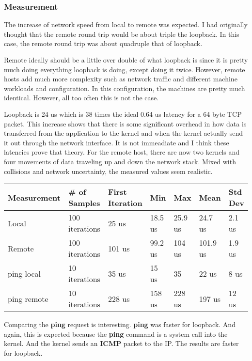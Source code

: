 \documentclass[paper=a4, fontsize=11pt]{scrartcl}
\numberwithin{equation}{section}        %
\numberwithin{figure}{section}          %
\numberwithin{table}{section}               %
\begin{document}
\subsubsection{Measurement}

The increase of network speed from local to remote was expected.  I had originally thought that the remote round trip would be about triple the loopback.  In this case, the remote round trip was about quadruple that of loopback.

Remote ideally should be a little over double of what loopback is since it is pretty much doing everything loopback is doing, except doing it twice.  However, remote hosts add much more complexity such as network traffic and different machine workloads and configuration.  In this configuration, the machines are pretty much identical.  However, all too often this is not the case.

Loopback is 24 us which is 38 times the ideal 0.64 us latency for a 64 byte TCP packet.  This increase shows that there is some significant overhead in how data is transferred from the application to the kernel and when the kernel actually send it out through the network interface.  It is not immeadiate and I think these latencies prove that theory.  For the remote host, there are now two kernels and four movements of data traveling up and down the network stack.  Mixed with collisions and network uncertainty, the measured values seem realistic.

\begin{center}
    \begin{tabular}{ | l | l | l | l | l | l | l |}
    \hline
    Measurement & \# of Samples & First Iteration & Min & Max & Mean & Std Dev \\
    \hline
    Local & 100 iterations & 25 us & 18.5 us & 25.9 us & 24.7 us & 2.1 us \\ 
    Remote & 100 iterations & 101 us & 99.2 us & 104 us & 101.9 us & 1.9 us \\
    ping local & 10 iterations & 35 us & 15 us & 35 & 22 us & 8 us \\
    ping remote & 10 iterations & 228 us & 158 us & 228 us & 197 us & 12 us \\
    \hline
    \end{tabular}
\end{center}

Comparing the \textbf{ping} request is interesting.  \textbf{ping} was faster for loopback.  And again, this is expected because the \textbf{ping} command is a system call into the kernel.  And the kernel sends an \textbf{ICMP} packet to the IP.  The results are faster for loopback.
\end{document}
